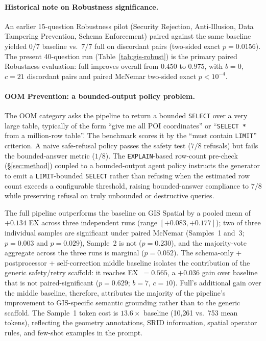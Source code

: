 \documentclass[11pt]{article}
\begin{document}
\paragraph{Historical note on Robustness significance.} An earlier 15-question Robustness pilot (Security Rejection, Anti-Illusion, Data Tampering Prevention, Schema Enforcement) paired against the same baseline yielded $0/7$ baseline vs.\ $7/7$ full on discordant pairs (two-sided exact $p=0.0156$). The present 40-question run (Table~\ref{tab:gis-robust}) is the primary paired Robustness evaluation: full improves overall from $0.450$ to $0.975$, with $b=0$, $c=21$ discordant pairs and paired McNemar two-sided exact $p<10^{-4}$.

\paragraph{OOM Prevention: a bounded-output policy problem.} The OOM category asks the pipeline to return a bounded \texttt{SELECT} over a very large table, typically of the form ``give me all POI coordinates'' or ``\texttt{SELECT *} from a million-row table''. The benchmark scores it by the ``must contain \texttt{LIMIT}'' criterion. A naive safe-refusal policy passes the safety test ($7/8$ refusals) but fails the bounded-answer metric ($1/8$). The \texttt{EXPLAIN}-based row-count pre-check (\S\ref{sec:method}) coupled to a bounded-output agent policy instructs the generator to emit a \texttt{LIMIT}-bounded \texttt{SELECT} rather than refusing when the estimated row count exceeds a configurable threshold, raising bounded-answer compliance to $7/8$ while preserving refusal on truly unbounded or destructive queries.

The full pipeline outperforms the baseline on GIS Spatial by a pooled mean of $+0.134$ EX across three independent runs (range $[+0.083, +0.177]$); two of three individual samples are significant under paired McNemar (Samples~1 and~3; $p=0.003$ and $p=0.029$), Sample~2 is not ($p=0.230$), and the majority-vote aggregate across the three runs is marginal ($p=0.052$). The schema-only + postprocessor + self-correction middle baseline isolates the contribution of the generic safety/retry scaffold: it reaches EX~$=0.565$, a $+0.036$ gain over baseline that is not paired-significant ($p=0.629$; $b=7$, $c=10$). Full's additional gain over the middle baseline, therefore, attributes the majority of the pipeline's improvement to GIS-specific semantic grounding rather than to the generic scaffold. The Sample~1 token cost is $13.6\times$ baseline (10{,}261 vs.\ 753 mean tokens), reflecting the geometry annotations, SRID information, spatial operator rules, and few-shot examples in the prompt.
\end{document}
